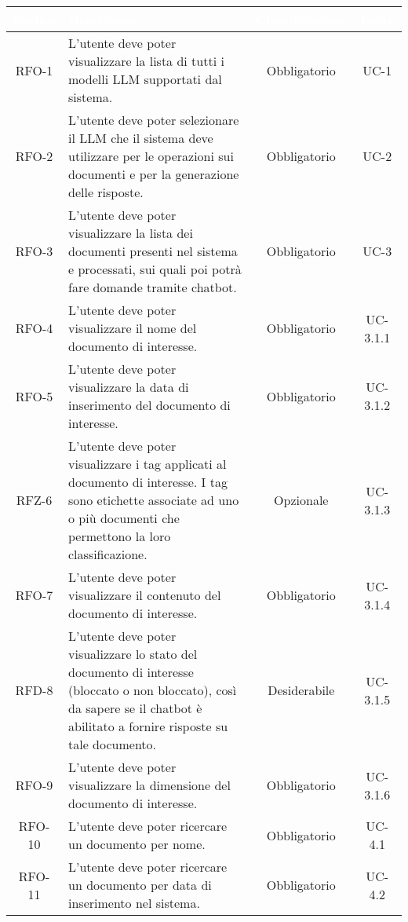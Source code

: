 \begingroup
\setlength{\tabcolsep}{10pt}
\renewcommand{\arraystretch}{1.5}
\begin{xltabular}{\textwidth}{| c | X | c | c |}
    \hline
     \textbf{\textcolor{white}{Codice}} & \textbf{\textcolor{white}{Descrizione}} & \textbf{\textcolor{white}{Classificazione}} & \textbf{\textcolor{white}{Fonte}}\\
    \hline
    \endhead
    RFO-1 & L’utente deve poter visualizzare la lista di tutti i modelli LLM supportati dal sistema. & Obbligatorio & UC-1 \\
    \hline
    RFO-2 & L’utente deve poter selezionare il LLM che il sistema deve utilizzare per le operazioni sui documenti e per la generazione delle risposte. & Obbligatorio & UC-2 \\
    \hline
    RFO-3 & L’utente deve poter visualizzare la lista dei documenti presenti nel sistema e processati, sui quali poi potrà fare domande tramite chatbot. & Obbligatorio & UC-3 \\
    \hline
    RFO-4 & L'utente deve poter visualizzare il nome del documento di interesse. & Obbligatorio & UC-3.1.1 \\
    \hline
    RFO-5 & L’utente deve poter visualizzare la data di inserimento del documento di interesse. & Obbligatorio & UC-3.1.2 \\
    \hline
    RFZ-6 & L’utente deve poter visualizzare i tag applicati al documento di interesse. I tag sono etichette associate ad uno o più documenti che permettono la loro classificazione. & Opzionale & UC-3.1.3 \\
    \hline
    RFO-7 & L’utente deve poter visualizzare il contenuto del documento di interesse. & Obbligatorio & UC-3.1.4 \\
    \hline
    RFD-8 & L’utente deve poter visualizzare lo stato del documento di interesse (bloccato o non bloccato), così da sapere se il chatbot è abilitato a fornire risposte su tale documento. & Desiderabile & UC-3.1.5 \\
    \hline
    RFO-9 & L’utente deve poter visualizzare la dimensione del documento di interesse. & Obbligatorio & UC-3.1.6 \\
    \hline
    RFO-10 & L’utente deve poter ricercare un documento per nome. & Obbligatorio & UC-4.1 \\
    \hline
    RFO-11 & L’utente deve poter ricercare un documento per data di inserimento nel sistema. & Obbligatorio & UC-4.2 \\
    \hline

\end{xltabular}
